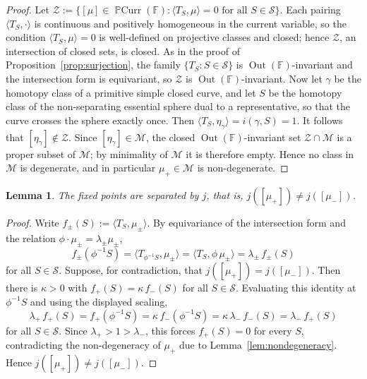 \documentclass[12pt,a4paper]{amsart}
\numberwithin{equation}{section}
\DeclareMathOperator{\Out}{Out}
\newcommand{\FF}{\mathbb{F}}
\theoremstyle{plain}
\newtheorem{lemma}[theorem]{Lemma}
\theoremstyle{definition}
\theoremstyle{remark}
\begin{document}
\begin{proof}
    Let $\mathcal{Z} := \{[\mu] \in \operatorname{\mathbb{P}Curr}(\FF) : \langle T_S, \mu\rangle = 0 \text{ for all } S \in \mathcal{S}\}$.
    Each pairing $\langle T_S, \cdot\rangle$ is continuous and positively homogeneous in the current variable, so the condition $\langle T_S, \mu\rangle = 0$ is well-defined on projective classes and closed; hence $\mathcal{Z}$, an intersection of closed sets, is closed.
    As in the proof of Proposition~\ref{prop:surjection}, the family $\{T_S : S \in \mathcal{S}\}$ is $\Out(\FF)$-invariant and the intersection form is equivariant, so $\mathcal{Z}$ is $\Out(\FF)$-invariant.
    Now let $\gamma$ be the homotopy class of a primitive simple closed curve, and let $S$ be the homotopy class of the non-separating essential sphere dual to a representative, so that the curve crosses the sphere exactly once.
    Then $\langle T_S, \eta_\gamma\rangle = i(\gamma, S) = 1$.
    It follows that $[\eta_\gamma] \notin \mathcal{Z}$.
    Since $[\eta_\gamma] \in \mathcal{M}$, the closed $\Out(\FF)$-invariant set $\mathcal{Z} \cap \mathcal{M}$ is a proper subset of $\mathcal{M}$; by minimality of $\mathcal{M}$ it is therefore empty.
    Hence no class in $\mathcal{M}$ is degenerate, and in particular $\mu_+ \in \mathcal{M}$ is non-degenerate.
\end{proof}

\begin{lemma}\label{lem:reciprocity}
    The fixed points are separated by $j$, that is, $j([\mu_+]) \neq j([\mu_-])$.
\end{lemma}

\begin{proof}
    Write $f_\pm(S) := \langle T_S, \mu_\pm\rangle$.
    By equivariance of the intersection form and the relation $\phi\cdot\mu_\pm = \lambda_\pm\mu_\pm$,
    \[
        f_\pm(\phi^{-1}S) = \langle T_{\phi^{-1}S}, \mu_\pm\rangle = \langle T_S, \phi\,\mu_\pm\rangle = \lambda_\pm\, f_\pm(S)
    \]
    for all $S \in \mathcal{S}$.
    Suppose, for contradiction, that $j([\mu_+]) = j([\mu_-])$.
    Then there is $\kappa > 0$ with $f_+(S) = \kappa\, f_-(S)$ for all $S \in \mathcal{S}$.
    Evaluating this identity at $\phi^{-1}S$ and using the displayed scaling,
    \[
        \lambda_+\, f_+(S) = f_+(\phi^{-1}S) = \kappa\, f_-(\phi^{-1}S) = \kappa\,\lambda_-\, f_-(S) = \lambda_-\, f_+(S)
    \]
    for all $S \in \mathcal{S}$.
    Since $\lambda_+ > 1 > \lambda_-$, this forces $f_+(S) = 0$ for every $S$, contradicting the non-degeneracy of $\mu_+$ due to Lemma~\ref{lem:nondegeneracy}.
    Hence $j([\mu_+]) \neq j([\mu_-])$.
\end{proof}
\end{document}
